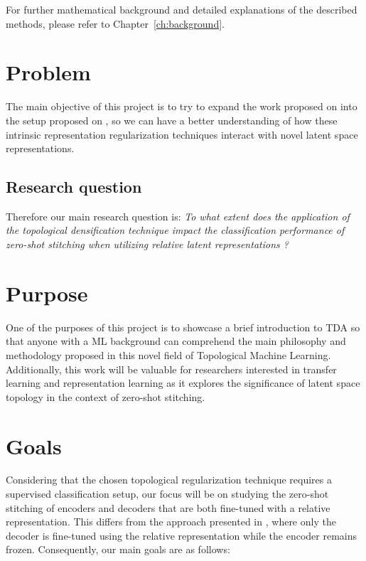 \documentclass[../main.tex]{subfiles}
\begin{document}
For further mathematical background and detailed explanations of the described methods, please refer to Chapter~\ref{ch:background}.

\section{Problem}
\label{sec:problem}


The main objective of this project is to try to expand the work proposed on \cite{hofer_densified_2021} into the setup proposed on \cite{moschella_relative_2022}, so we can have a better understanding of how these intrinsic representation regularization techniques interact with novel latent space representations.

\subsection{Research question}
\label{sec:researchQuestion}

Therefore our main research question is: \emph{To what extent does the application of the topological densification technique \cite{hofer_densified_2021} impact the classification performance of zero-shot stitching when utilizing relative latent representations \cite{moschella_relative_2022}?}

\section{Purpose}

One of the purposes of this project is to showcase a brief introduction to TDA so that anyone with a ML background can comprehend the main philosophy and methodology proposed in this novel field of Topological Machine Learning. Additionally, this work will be valuable for researchers interested in transfer learning and representation learning as it explores the significance of latent space topology in the context of zero-shot stitching.


\section{Goals}

Considering that the chosen topological regularization technique \cite{hofer_densified_2021} requires a supervised classification setup, our focus will be on studying the zero-shot stitching of encoders and decoders that are both fine-tuned with a relative representation. This differs from the approach presented in \cite{moschella_relative_2022}, where only the decoder is fine-tuned using the relative representation while the encoder remains frozen. Consequently, our main goals are as follows:
\end{document}
